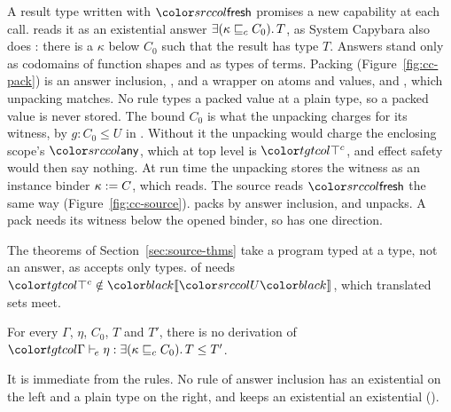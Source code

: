 A result type written with $\cfresh$ promises a new capability at each call. \treeCC reads it as an existential answer $\exists(\kappa \sqsubseteq_{c} C_0).\,T$, as System Capybara also does \cite{xu2026capybara}: there is a $\kappa$ below $C_0$ such that the result has type $T$. Answers stand only as codomains of function shapes and as types of terms. Packing (Figure~\ref{fig:cc-pack}) is an answer inclusion, , and a wrapper on atoms and values,  and , which unpacking matches. No rule types a packed value at a plain type, so a packed value is never stored. The bound $C_0$ is what the unpacking charges for its witness, by $g : C_0 \le U$ in . Without it the unpacking would charge the enclosing scope's $\cany$, which at top level is $\topc$, and effect safety would then say nothing. At run time the unpacking stores the witness as an instance binder $\kappa \mathrel{:=}C$, which  reads. The source reads $\cfresh$ the same way (Figure~\ref{fig:cc-source}).  packs by answer inclusion, and  unpacks. A pack needs its witness below the opened binder, so  has one direction.

The theorems of Section~\ref{sec:source-thms} take a program typed at a type, not an answer, as  accepts only types.  of \treeCC needs $\topc \notin \trans{U}$, which translated sets meet.

\begin{remark}\label{rem:lvl-ex}
For every $\Gamma$, $\eta$, $C_0$, $T$ and $T'$, there is no derivation of $\elej{\Gamma}{\eta}{\exc{\kappa}{C_0}{T}}{T'}$.
\end{remark}

It is immediate from the rules. No rule of answer inclusion has an existential on the left and a plain type on the right, and  keeps an existential an existential ().

